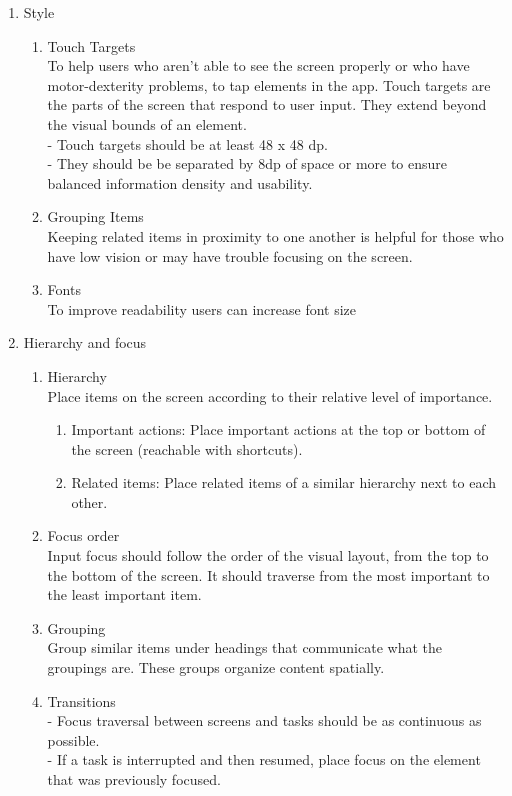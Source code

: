 \begin{enumerate}
    \item{Style}
    	\begin{enumerate}
        	\item{Touch Targets\\To help users who aren't able to see the screen properly or who have motor-dexterity problems, to tap elements in the app. Touch targets are the parts of the screen that respond to user input. They extend beyond the visual bounds of an element. \\- Touch targets should be at least 48 x 48 dp. \\- They should be be separated by 8dp of space or more to ensure balanced information density and usability. }
            \item{Grouping Items\\Keeping related items in proximity to one another is helpful for those who have low vision or may have trouble focusing on the screen.}
            \item{Fonts\\To improve readability users can increase font size}
        \end{enumerate}
    \item{Hierarchy and focus}
    	\begin{enumerate}
        	\item{Hierarchy\\Place items on the screen according to their relative level of importance.}
            \begin{enumerate}
            	\item{Important actions: Place important actions at the top or bottom of the screen (reachable with shortcuts).}
                \item{Related items: Place related items of a similar hierarchy next to each other.}
            \end{enumerate}
            \item{Focus order\\Input focus should follow the order of the visual layout, from the top to the bottom of the screen. It should traverse from the most important to the least important item.}
            \item{Grouping\\Group similar items under headings that communicate what the groupings are. These groups organize content spatially.}
            \item{Transitions\\
- Focus traversal between screens and tasks should be as continuous as possible.\\
- If a task is interrupted and then resumed, place focus on the element that was previously focused.}


\end{enumerate}
\end{enumerate}
